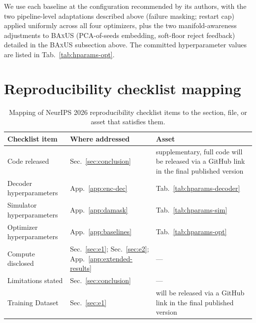 \documentclass{article}
\newcommand{\baxus}{\textsc{BAxUS}}
\begin{document}
We use each baseline at the configuration recommended by its authors, with the two pipeline-level adaptations described above (failure masking; restart cap) applied uniformly across all four optimizers, plus the two manifold-awareness adjustments to \baxus{} (PCA-of-seeds embedding, soft-floor reject feedback) detailed in the \baxus{} subsection above. The committed hyperparameter values are listed in Tab.~\ref{tab:hparams-opt}.

\section{Reproducibility checklist mapping}
\label{app:repro}

\begin{table}[H]
  \caption{Mapping of NeurIPS 2026 reproducibility checklist items to the section, file, or asset that satisfies them.}
  \label{tab:repro}
  \centering
  \small
  \setlength{\tabcolsep}{4pt}
  \begin{tabularx}{\linewidth}{@{}l l X@{}}
    \toprule
    Checklist item & Where addressed & Asset \\
    \midrule
    Code released                  & Sec.~\ref{sec:conclusion}        & supplementary, full code will be released via a GitHub link in the final published version \\
    Decoder hyperparameters        & App.~\ref{app:enc-dec}           & Tab.~\ref{tab:hparams-decoder} \\
    Simulator hyperparameters      & App.~\ref{app:damask}            & Tab.~\ref{tab:hparams-sim} \\
    Optimizer hyperparameters      & App.~\ref{app:baselines}         & Tab.~\ref{tab:hparams-opt} \\
    Compute disclosed              & Sec.~\ref{sec:e1}; Sec.~\ref{sec:e2}; App.~\ref{app:extended-results}       & --- \\
    Limitations stated             & Sec.~\ref{sec:conclusion}        & --- \\
    Training Dataset               & Sec.~\ref{sec:e1}                & will be released via a GitHub link in the final published version \\
    \bottomrule
  \end{tabularx}
\end{table}

\newpage

\end{document}
